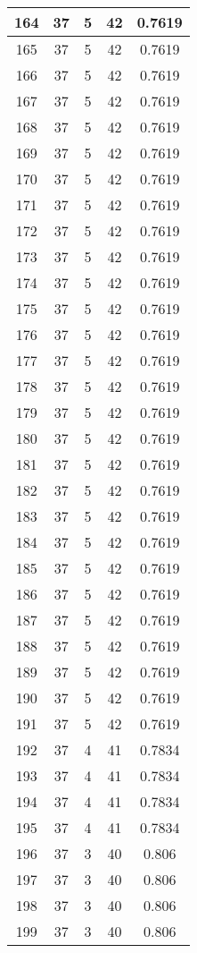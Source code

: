 \documentclass[letterpaper, 12pt]{article}
\begin{document}
\begin{longtable}{|c|c|c|c|c|}
\hline
164 & 37 & 5 & 42 & 0.7619 \\
\hline
165 & 37 & 5 & 42 & 0.7619 \\
\hline
166 & 37 & 5 & 42 & 0.7619 \\
\hline
167 & 37 & 5 & 42 & 0.7619 \\
\hline
168 & 37 & 5 & 42 & 0.7619 \\
\hline
169 & 37 & 5 & 42 & 0.7619 \\
\hline
170 & 37 & 5 & 42 & 0.7619 \\
\hline
171 & 37 & 5 & 42 & 0.7619 \\
\hline
172 & 37 & 5 & 42 & 0.7619 \\
\hline
173 & 37 & 5 & 42 & 0.7619 \\
\hline
174 & 37 & 5 & 42 & 0.7619 \\
\hline
175 & 37 & 5 & 42 & 0.7619 \\
\hline
176 & 37 & 5 & 42 & 0.7619 \\
\hline
177 & 37 & 5 & 42 & 0.7619 \\
\hline
178 & 37 & 5 & 42 & 0.7619 \\
\hline
179 & 37 & 5 & 42 & 0.7619 \\
\hline
180 & 37 & 5 & 42 & 0.7619 \\
\hline
181 & 37 & 5 & 42 & 0.7619 \\
\hline
182 & 37 & 5 & 42 & 0.7619 \\
\hline
183 & 37 & 5 & 42 & 0.7619 \\
\hline
184 & 37 & 5 & 42 & 0.7619 \\
\hline
185 & 37 & 5 & 42 & 0.7619 \\
\hline
186 & 37 & 5 & 42 & 0.7619 \\
\hline
187 & 37 & 5 & 42 & 0.7619 \\
\hline
188 & 37 & 5 & 42 & 0.7619 \\
\hline
189 & 37 & 5 & 42 & 0.7619 \\
\hline
190 & 37 & 5 & 42 & 0.7619 \\
\hline
191 & 37 & 5 & 42 & 0.7619 \\
\hline
192 & 37 & 4 & 41 & 0.7834 \\
\hline
193 & 37 & 4 & 41 & 0.7834 \\
\hline
194 & 37 & 4 & 41 & 0.7834 \\
\hline
195 & 37 & 4 & 41 & 0.7834 \\
\hline
196 & 37 & 3 & 40 & 0.806 \\
\hline
197 & 37 & 3 & 40 & 0.806 \\
\hline
198 & 37 & 3 & 40 & 0.806 \\
\hline
199 & 37 & 3 & 40 & 0.806 \\
\hline
\end{longtable}
\end{document}
